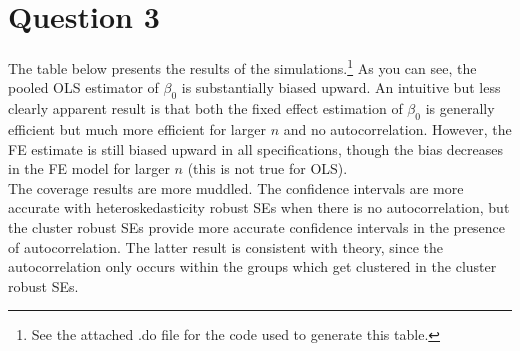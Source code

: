 \documentclass{article}
\begin{document}
\section*{Question 3}
The table below presents the results of the simulations.\footnote{See the attached .do file for the code used to generate this table.} As you can see, the pooled OLS estimator of $\beta_0$ is substantially biased upward. An intuitive but less clearly apparent result is that both the fixed effect estimation of $\beta_0$ is generally efficient but much more efficient for larger $n$ and no autocorrelation. However, the FE estimate is still biased upward in all specifications, though the bias decreases in the FE model for larger $n$ (this is not true for OLS).
\medskip \\
The coverage results are more muddled. The confidence intervals are more accurate with heteroskedasticity robust SEs when there is no autocorrelation, but the cluster robust SEs provide more accurate confidence intervals in the presence of autocorrelation. The latter result is consistent with theory, since the autocorrelation only occurs within the groups which get clustered in the cluster robust SEs.
\begin{center}
	
\end{center}




\end{document}
